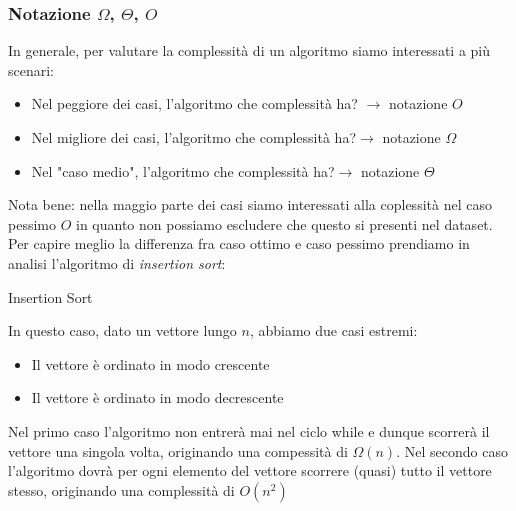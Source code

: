 \subsubsection*{Notazione $ \Omega $, $ \Theta $, $ O $}
In generale, per valutare la complessità di un algoritmo siamo interessati a più scenari:
\begin{itemize}
	\item Nel peggiore dei casi, l'algoritmo che complessità ha? $ \rightarrow  $ notazione $ O $
	\item Nel migliore dei casi, l'algoritmo che complessità ha?$ \rightarrow  $ notazione $ \Omega  $
	\item Nel "caso medio", l'algoritmo che complessità ha?$ \rightarrow  $ notazione $ \Theta $
\end{itemize}
Nota bene: nella maggio parte dei casi siamo interessati alla coplessità nel caso pessimo $ O $ in quanto non possiamo escludere che questo si presenti nel dataset.
\vskip3mm
Per capire meglio la differenza fra caso ottimo e caso pessimo prendiamo in analisi l'algoritmo di \textit{insertion sort}:

\begin{algoritmo*}{Insertion Sort}
	\begin{algorithm}[H]
	\end{algorithm}
\end{algoritmo*}
In questo caso, dato un vettore lungo $ n $, abbiamo due casi estremi:
\begin{itemize}
	\item Il vettore è ordinato in modo crescente
	\item Il vettore è ordinato in modo decrescente
\end{itemize}
Nel primo caso l'algoritmo non entrerà mai nel ciclo while e dunque scorrerà il vettore una singola volta, originando una compessità di $ \Omega \left(n\right) $.
\vskip3mm
Nel secondo caso l'algoritmo dovrà per ogni elemento del vettore scorrere (quasi) tutto il vettore stesso, originando una complessità di $ O\left(n^2 \right) $


